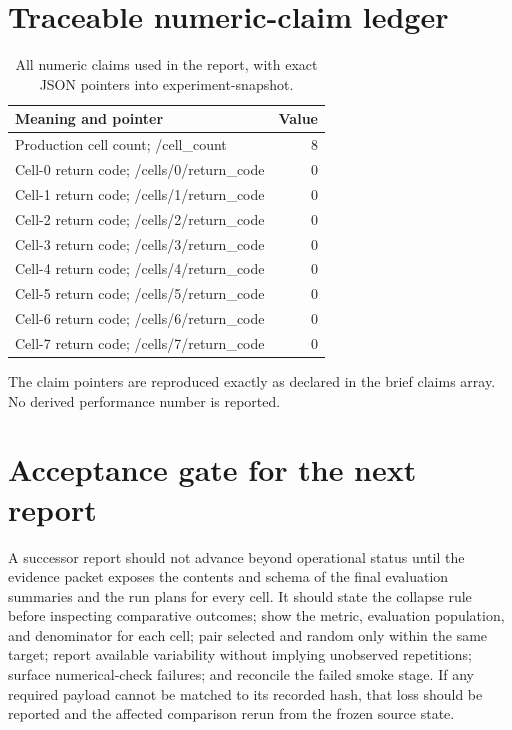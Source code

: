 \documentclass[10pt,twocolumn,letterpaper]{article}
\begin{document}
\section{Traceable numeric-claim ledger}\label{claim-ledger}
\begin{table}[H]\centering\normalsize
\caption{All numeric claims used in the report, with exact JSON pointers into experiment-snapshot.}
\begin{tabularx}{\textwidth}{@{}Xr@{}}
\toprule
Meaning and pointer & Value \\ \midrule
Production cell count; /cell\_count & 8 \\
Cell-0 return code; /cells/0/return\_code & 0 \\
Cell-1 return code; /cells/1/return\_code & 0 \\
Cell-2 return code; /cells/2/return\_code & 0 \\
Cell-3 return code; /cells/3/return\_code & 0 \\
Cell-4 return code; /cells/4/return\_code & 0 \\
Cell-5 return code; /cells/5/return\_code & 0 \\
Cell-6 return code; /cells/6/return\_code & 0 \\
Cell-7 return code; /cells/7/return\_code & 0 \\
\bottomrule\end{tabularx}\end{table}
The claim pointers are reproduced exactly as declared in the brief claims array. No derived performance number is reported.

\section{Acceptance gate for the next report}\label{acceptance-gate}
A successor report should not advance beyond operational status until the evidence packet exposes the contents and schema of the final evaluation summaries and the run plans for every cell. It should state the collapse rule before inspecting comparative outcomes; show the metric, evaluation population, and denominator for each cell; pair selected and random only within the same target; report available variability without implying unobserved repetitions; surface numerical-check failures; and reconcile the failed smoke stage. If any required payload cannot be matched to its recorded hash, that loss should be reported and the affected comparison rerun from the frozen source state.
\end{document}
